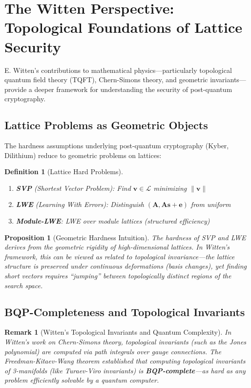 \documentclass[11pt,a4paper]{article}
\newtheorem{proposition}[theorem]{Proposition}
\newtheorem{definition}[theorem]{Definition}
\newtheorem{remark}[theorem]{Remark}
\begin{document}
\section{The Witten Perspective: Topological Foundations of Lattice Security}

E. Witten's contributions to mathematical physics---particularly topological quantum field theory (TQFT), Chern-Simons theory, and geometric invariants---provide a deeper framework for understanding the security of post-quantum cryptography.

\subsection{Lattice Problems as Geometric Objects}

The hardness assumptions underlying post-quantum cryptography (Kyber, Dilithium) reduce to geometric problems on lattices:

\begin{definition}[Lattice Hard Problems]
\begin{enumerate}[noitemsep]
    \item \textbf{SVP} (Shortest Vector Problem): Find $\mathbf{v} \in \mathcal{L}$ minimizing $\|\mathbf{v}\|$
    \item \textbf{LWE} (Learning With Errors): Distinguish $(\mathbf{A}, \mathbf{A}\mathbf{s} + \mathbf{e})$ from uniform
    \item \textbf{Module-LWE}: LWE over module lattices (structured efficiency)
\end{enumerate}
\end{definition}

\begin{proposition}[Geometric Hardness Intuition]
The hardness of SVP and LWE derives from the \textit{geometric rigidity} of high-dimensional lattices. In Witten's framework, this can be viewed as related to topological invariance---the lattice structure is preserved under continuous deformations (basis changes), yet finding short vectors requires ``jumping'' between topologically distinct regions of the search space.
\end{proposition}

\subsection{BQP-Completeness and Topological Invariants}

\begin{remark}[Witten's Topological Invariants and Quantum Complexity]
In Witten's work on Chern-Simons theory, topological invariants (such as the Jones polynomial) are computed via path integrals over gauge connections. The Freedman-Kitaev-Wang theorem established that computing topological invariants of 3-manifolds (like Turaev-Viro invariants) is \textbf{BQP-complete}---as hard as any problem efficiently solvable by a quantum computer.
\end{remark}
\end{document}
